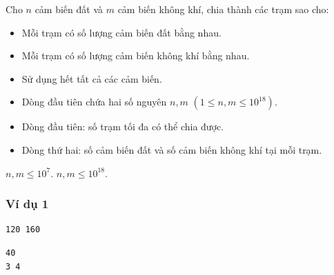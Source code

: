 
Cho $n$ cảm biến đất và $m$ cảm biến không khí, chia thành các trạm sao cho:

\begin{itemize}
    \item Mỗi trạm có số lượng cảm biến đất bằng nhau.
    \item Mỗi trạm có số lượng cảm biến không khí bằng nhau.  
    \item Sử dụng hết tất cả các cảm biến.
\end{itemize}

\begin{itemize}
    \item Dòng đầu tiên chứa hai số nguyên $n, m$ $(1 \le n, m \le 10^{18})$.
\end{itemize}

\begin{itemize}
    \item Dòng đầu tiên: số trạm tối đa có thể chia được.
    \item Dòng thứ hai: số cảm biến đất và số cảm biến không khí tại mỗi trạm.
\end{itemize}

\begin{makesubtasks}
     $n, m \le 10^{7}$.
     $n, m \le 10^{18}$.
\end{makesubtasks}


\subsubsection*{Ví dụ 1}
\begin{makesample}
\begin{lstlisting}
120 160
\end{lstlisting}
\nextsample
\begin{lstlisting}
40
3 4
\end{lstlisting}
\end{makesample}
